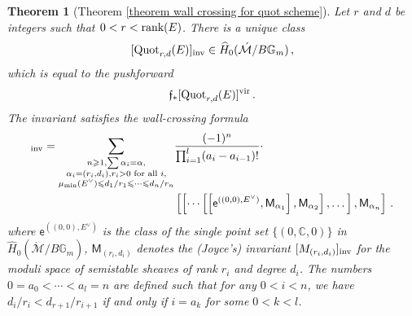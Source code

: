 \documentclass[11pt]{amsart}
\newtheorem*{theorem*}{Theorem}
\theoremstyle{remark}
\newcommand{\C}{\mathbb{C}}
\newcommand{\mf}[1]{\mathfrak{#1}}
\newcommand{\mb}[1]{\mathbb{#1}}
\newcommand{\Mdash}{\acute{\mathcal{M}}}
\newcommand{\rk}{\textnormal{rank}}
\newcommand{\wh}[1]{\widehat{#1}}
\newcommand{\quot}[0]{\textnormal{Quot}}
\newcommand{\vir}[0]{\textnormal{vir}}
\newcommand{\inv}[0]{\textnormal{inv}}
\newcommand{\sfM}{\mathsf M}
\numberwithin{theorem}{section}
\begin{document}
    \begin{theorem*}[Theorem \ref{theorem wall crossing for quot scheme}]
        Let $r$ and $d$ be integers such that
        $0<r<\rk(E)$.
        There is a unique class 
        $$[\quot_{r,d}(E)]_\inv \in \wh H_{0}(\Mdash/B \mb G_m)\,,$$
        which is equal to the pushforward 
        $$\mf f_*[\quot_{r,d}(E)]^\vir\,.$$
        The invariant satisfies the wall-crossing formula
        \begin{align*}
            [\quot_{r,d}(E)]_\inv
            =\sum_{\substack{n\geqslant 1, \sum \alpha_i = \alpha, \\ 
            \alpha_i=(r_i,d_i), r_i>0 \text{ for all }i,\\
            \mu_{\min}(E^\vee) \leqslant d_1/r_1\leqslant\cdots\leqslant d_n/r_n}} &
            \frac{(-1)^{n}}{\prod_{i=1}^l (a_i - a_{i-1})!} \cdot \\
            &  \left[\left[ \cdots
     \left[ \left[\mathsf e^{((0,0),E^\vee)},\sfM_{\alpha_1} \right], \sfM_{\alpha_2} \right],\dots \right], \sfM_{\alpha_n} \right]\,.
    \end{align*}
    where $\mathsf e^{((0,0),E^\vee)}$ is the class of the single point set $\{(0,\C,0)\}$ in $\wh H_{0}(\Mdash/B \mb G_m)$,
    $\sfM_{(r_i,d_i)}$ denotes the (Joyce's) invariant
    $[M_{(r_i,d_i)}]_\inv$
    for the moduli space of semistable sheaves of rank $r_i$ and degree $d_i$.
    The numbers $0=a_0<\cdots<a_l=n$ are defined such that for any $0<i<n$, we have $d_i/r_i<d_{r+1}/r_{i+1}$ if and only if $i=a_k$ for some $0<k<l$.
    \end{theorem*}
    
\end{document}
